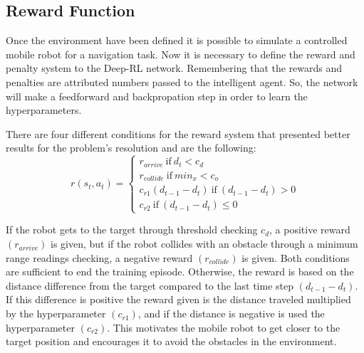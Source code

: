 \subsection{Reward Function}

Once the environment have been defined it is possible to simulate a controlled mobile robot for a navigation task.
Now it is necessary to define the reward and penalty system to the Deep-RL network.
Remembering that the rewards and penalties are attributed numbers passed to the intelligent agent.
So, the network will make a feedforward and backpropation step in order to learn the hyperparameters.

There are four different conditions for the reward system that presented better results for the problem's resolution and are the following:
\begin{equation}
r (s_t, a_t) = 
\begin{cases}
r_{arrive} \ \textrm{if} \ d_t < c_d
\\
r_{collide} \ \textrm{if}\ min_x < c_o
\\
c_{r1}(d_{t-1} - d_t) \ \textrm{if} \ (d_{t-1} - d_t) > 0
\\
c_{r2} \ \textrm{if} \ (d_{t-1} - d_t) \leq 0
\end{cases}
\end{equation}

If the robot gets to the target through threshold checking $c_d$, a positive reward $(r_{arrive})$ is given, but if the robot collides with an obstacle through a minimum range readings checking, a negative reward $(r_{collide})$ is given.
Both conditions are sufficient to end the training episode.
Otherwise, the reward is based on the distance difference from the target compared to the last time step $(d_{t-1} - d_t)$. 
If this difference is positive the reward given is the distance traveled multiplied by the hyperparameter $(c_{r1})$, and if the distance is negative is used the hyperparameter $(c_{r2})$.
This motivates the mobile robot to get closer to the target position and encourages it to avoid the obstacles in the environment.


